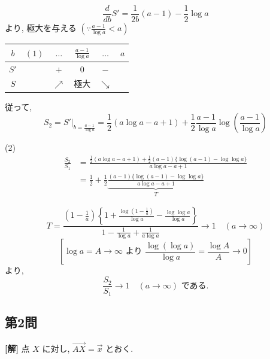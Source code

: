 \documentclass[../main.tex]{subfiles}
\begin{document}
\[
  \frac{d}{db} S' = \frac{1}{2b}(a - 1) - \frac{1}{2} \log a
\]
より, 極大を与える $\left(\because \frac{a-1}{\log a} < a\right)$

\begin{center}
  \begin{tabular}{c|ccccc}
    $b$ & $(1)$ & $\dots$ & $\frac{a-1}{\log a}$ & $\dots$ & $a$ \\ \hline
    $S'$ & & $+$ & $0$ & $-$ & \\ \hline
    $S$ & & $\nearrow$ & 極大 & $\searrow$ &
  \end{tabular}
\end{center}

従って,
\[
  S_2 = S'\Big|_{b = \frac{a-1}{\log a}} = \frac{1}{2}(a \log a - a + 1) + \frac{1}{2} \frac{a-1}{\log a} \log\left(\frac{a-1}{\log a}\right)
\]

\bigskip

(2)
\begin{align*}
  \frac{S_2}{S_1} &= \frac{\frac{1}{2}(a \log a - a + 1) + \frac{1}{2}(a-1)\{\log(a-1) - \log\log a\}}{a \log a - a + 1} \\
  &= \frac{1}{2} + \frac{1}{2} \underbrace{\frac{(a-1)\{\log(a-1) - \log\log a\}}{a \log a - a + 1}}_{T}
\end{align*}

\[
  T = \frac{\left(1 - \frac{1}{a}\right) \left\{ 1 + \frac{\log(1 - \frac{1}{a})}{\log a} - \frac{\log\log a}{\log a} \right\}}{1 - \frac{1}{\log a} + \frac{1}{a \log a}} \longrightarrow 1 \quad (a \to \infty)
\]
\[
  \left[ \log a = A \to \infty \text{ より } \frac{\log(\log a)}{\log a} = \frac{\log A}{A} \to 0 \right]
\]
より,
\[
  \frac{S_2}{S_1} \longrightarrow 1 \quad (a \to \infty) \text{ である.}
\]

\newpage

\subsection*{第2問}

\noindent
\textbf{[解]} 点 $X$ に対し, $\vec{AX} = \vec{x}$ とおく.

\bigskip
\end{document}
